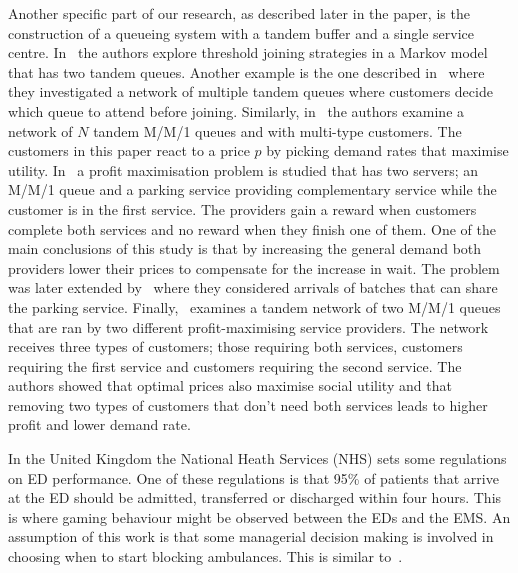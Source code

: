 Another specific part of our research, as described later in the paper, is the 
construction of a queueing system with a tandem buffer and a single service
centre.
In~\cite{d2015pure} the authors explore threshold joining strategies in a 
Markov model that has two tandem queues.
Another example is the one described in~\cite{burnetas2013customer}
where they investigated a network of multiple tandem queues where customers 
decide which queue to attend before joining.
Similarly, in~\cite{bacsar2002stackelberg} the authors examine a network of 
\(N\) tandem M/M/1 queues and with multi-type customers. 
The customers in this paper react to a price \(p\) by picking demand rates that 
maximise utility.
In~\cite{veltman2005equilibrium} a profit maximisation problem is studied that
has two servers; an M/M/1 queue and a parking service providing complementary 
service while the customer is in the first service. 
The providers gain a reward when customers complete both services and no reward 
when they finish one of them.
One of the main conclusions of this study is that by increasing the general 
demand both providers lower their prices to compensate for the increase in wait.
The problem was later extended by~\cite{sun2009equilibrium} where they 
considered arrivals of batches that can share the parking service.
Finally,~\cite{afeche2007decentralized} examines a tandem network of two M/M/1 
queues that are ran by two different profit-maximising service providers.
The network receives three types of customers; those requiring both services, 
customers requiring the first service and customers requiring the second service.
The authors showed that optimal prices also maximise social utility and that
removing two types of customers that don't need both services leads to higher 
profit and lower demand rate.

In the United Kingdom the National Heath Services (NHS) sets some regulations 
on ED performance.
One of these regulations is that 95\% of patients that arrive at the ED should 
be admitted, transferred or discharged within four hours.
This is where gaming behaviour might be observed between the EDs and the EMS.
An assumption of this work is that some managerial decision making is involved
in choosing when to start blocking ambulances.
This is similar to~\cite{deo2011centralized}.

